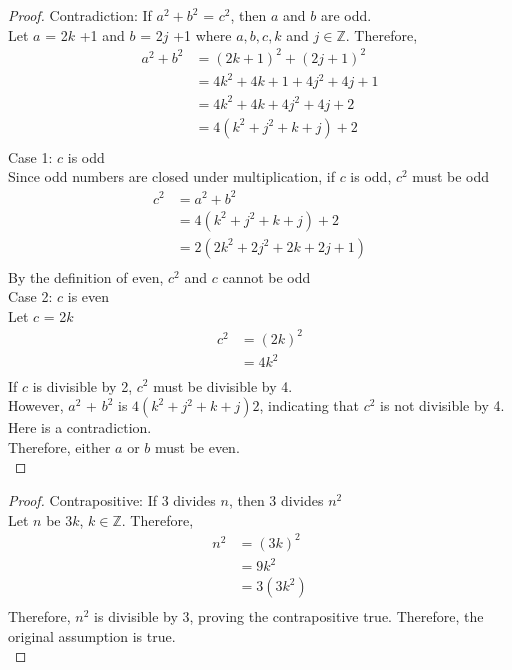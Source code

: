 \documentclass[a4paper]{article}
\begin{document}
\begin{proof}

 Contradiction: If $a^2 + b^2$ = $c^2 $, then $a$ and $b$ are odd.\\
Let $a$ = 2$k$ +1 and $b$ = 2$j$ +1 where $a,b,c,k$ and $j \in \mathbb{Z}$. Therefore,
  \begin{align*}
    a^2 + b^2 &= (2k+1)^2 + (2j+1)^2\\
    &= 4k^2 + 4k +1 + 4j^2 + 4j +1 \\
    &= 4k^2 + 4k  + 4j^2 + 4j +2 \\
    &= 4(k^2 + j^2 + k + j) + 2 \\
  \end{align*}
  Case 1: $c$ is odd \\
  Since odd numbers are closed under multiplication, if $c$ is odd, $c^2$ must be odd \\
  \begin{align*}
  c^2 &= a^2 + b^2 \\
  &= 4(k^2 + j^2 + k + j) + 2 \\
  &= 2(2k^2 + 2j^2 + 2k + 2j +1) \\
  \end{align*}
  By the definition of even, $c^2$ and $c$ cannot be odd\\\linebreak 
  Case 2: $c$ is even\\
  Let $c$ = 2$k$\\
  \begin{align*}
c^2 &= (2k)^2  \\
&=4k^2\\
\end{align*}
If $c$ is divisible by 2, $c^2$ must be divisible by 4. \\
However, $a^2$ + $b^2$ is $4(k^2 + j^2 + k  + j)  2$, indicating that $c^2$ is not divisible by 4. \\Here is a contradiction. \\Therefore, either $a$ or $b$ must be even. \\
\end{proof}


\begin{proof}
Contrapositive: If 3 divides $n$, then 3 divides $n^2$ \\
Let $n$ be $3k$, $k \in \mathbb{Z}$. Therefore, 
\begin{align*}
n^2 &= (3k)^2\\
&= 9k^2\\
&=3(3k^2)\\
\end{align*}
Therefore, $n^2$ is divisible by 3, proving the contrapositive true. Therefore, the original assumption is true.\\
\end{proof}
\end{document}
